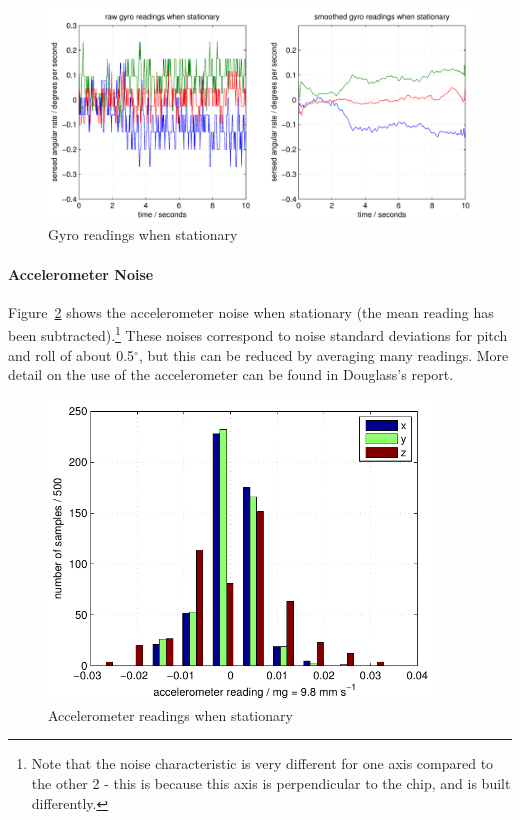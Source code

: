 \documentclass{IIBproject}
\begin{document}
\begin{figure}[htpb]
  \begin{center}
    \includegraphics[width=15cm]{figures/gyro_stat.pdf}
    \end{center}
    \caption{Gyro readings when stationary}
    \label{fig:gyro_stat}
    \end{figure}

\paragraph{Accelerometer Noise}
Figure~\ref{fig:acc_stat} shows the accelerometer noise when stationary (the
mean reading has been subtracted).\footnote{Note that the noise characteristic is very
different for one axis compared to the other 2 - this is because this axis is
perpendicular to the chip, and is built differently.} These noises correspond
to noise standard deviations for pitch and roll of about 0.5$^\circ$, but this
can be reduced by averaging many readings. More detail on the use of the
accelerometer can be found in Douglass's report.

\begin{figure}[htpb]
  \begin{center}
    \includegraphics[height=8cm]{figures/acc_stat.pdf}
    \end{center}
    \caption{Accelerometer readings when stationary}
    \label{fig:acc_stat}
    \end{figure}
\end{document}
